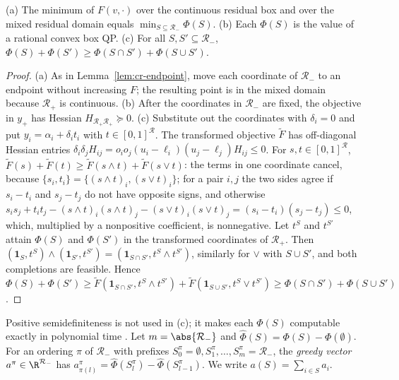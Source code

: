 \begin{proposition}\label{prop:cr-submod}
(a) The minimum of $F(v,\cdot)$ over the continuous residual box and over
the mixed residual domain equals $\min_{S\subseteq\mathcal R_-}\Phi(S)$.
(b) Each $\Phi(S)$ is the value of a rational convex box QP.
(c) For all $S,S'\subseteq\mathcal R_-$,
$\Phi(S)+\Phi(S')\ge\Phi(S\cap S')+\Phi(S\cup S')$.
\end{proposition}

\begin{proof}
(a) As in Lemma~\ref{lem:cr-endpoint}, move each coordinate of
$\mathcal R_-$ to an endpoint without increasing $F$; the resulting point is
in the mixed domain because $\mathcal R_+$ is continuous. (b) After the
coordinates in $\mathcal R_-$ are fixed, the objective in $y_+$ has Hessian
$H_{\mathcal R_+\mathcal R_+}\succeq0$.
(c) Substitute out the coordinates with $\delta_i=0$ and put
$y_i=\alpha_i+\delta_it_i$ with $t\in[0,1]^{\mathcal R}$. The transformed
objective $\tilde F$ has off-diagonal Hessian entries
$\delta_i\delta_jH_{ij}=o_io_j(u_i-\ell_i)(u_j-\ell_j)H_{ij}\le0$. For
$s,t\in[0,1]^{\mathcal R}$,
$\tilde F(s)+\tilde F(t)\ge\tilde F(s\wedge t)+\tilde F(s\vee t)$: the
terms in one coordinate cancel, because $\{s_i,t_i\}=\{(s\wedge
t)_i,(s\vee t)_i\}$; for a pair $i,j$ the two sides agree if $s_i-t_i$ and
$s_j-t_j$ do not have opposite signs, and otherwise
$s_is_j+t_it_j-(s\wedge t)_i(s\wedge t)_j-(s\vee t)_i(s\vee t)_j
=(s_i-t_i)(s_j-t_j)\le0$, which, multiplied by a nonpositive coefficient,
is nonnegative. Let $t^S$ and $t^{S'}$ attain $\Phi(S)$ and $\Phi(S')$ in
the transformed coordinates of $\mathcal R_+$. Then
$(\mathbf 1_S,t^S)\wedge(\mathbf 1_{S'},t^{S'})
=(\mathbf 1_{S\cap S'},t^S\wedge t^{S'})$, similarly for $\vee$ with
$S\cup S'$, and both completions are feasible. Hence
$\Phi(S)+\Phi(S')\ge\tilde F(\mathbf 1_{S\cap S'},t^S\wedge t^{S'})
+\tilde F(\mathbf 1_{S\cup S'},t^S\vee t^{S'})\ge\Phi(S\cap S')+\Phi(S\cup S')$.
\end{proof}

Positive semidefiniteness is not used in (c); it makes each $\Phi(S)$
computable exactly in polynomial time \cite{KozlovTarasovKhachiyan1980}.
Let $m=\abs{\mathcal R_-}$ and $\hat\Phi(S)=\Phi(S)-\Phi(\emptyset)$. For an
ordering $\pi$ of $\mathcal R_-$ with prefixes
$S^\pi_0=\emptyset,S^\pi_1,\dots,S^\pi_m=\mathcal R_-$, the \emph{greedy
vector} $a^\pi\in\R^{\mathcal R_-}$ has
$a^\pi_{\pi(l)}=\hat\Phi(S^\pi_l)-\hat\Phi(S^\pi_{l-1})$. We write
$a(S)=\sum_{i\in S}a_i$.

